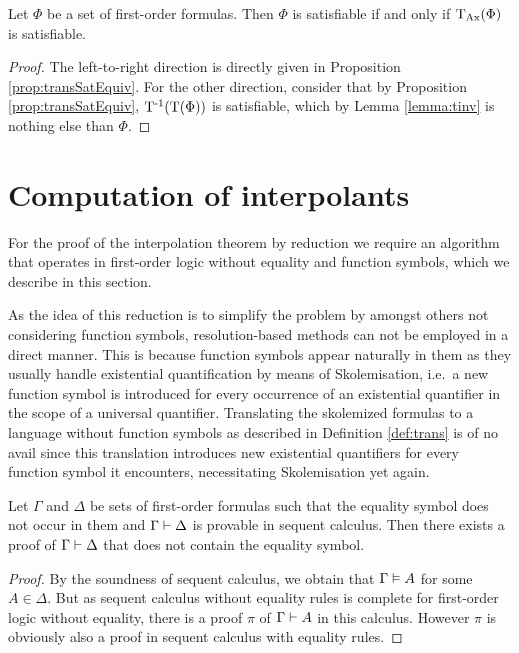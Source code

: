 \begin{corr}
	Let $\Phi$ be a set of first-order formulas.
	Then $\Phi$ is satisfiable if and only if $\operatorname{\operatorname{T}_{Ax}}(\Phi)$ is satisfiable.
\end{corr}
\begin{proof}
	The left-to-right direction is directly given in Proposition \ref{prop:transSatEquiv}.
	For the other direction, consider that by Proposition \ref{prop:transSatEquiv}, $\operatorname{T^{-1}}(\operatorname{T}(\Phi))$ is satisfiable, which by Lemma \ref{lemma:tinv} is nothing else than $\Phi$.
\end{proof}



\section{Computation of interpolants}

For the proof of the interpolation theorem by reduction we require an algorithm that operates in first-order logic without equality and function symbols, which we describe in this section.

\begin{remark}
	As the idea of this reduction is to simplify the problem by amongst others not considering function symbols,
	resolution-based methods can not be employed in a direct manner.
	This is because function symbols appear naturally in them as they usually handle existential quantification by means of Skolemisation, i.e.~a new function symbol is introduced for every occurrence of an existential quantifier in the scope of a universal quantifier.
	Translating the skolemized formulas to a language without function symbols as described in Definition \ref{def:trans} is of no avail since this translation introduces new existential quantifiers for every function symbol it encounters, necessitating Skolemisation yet again.
\end{remark}


\begin{lemma}
	\label{lemma:no_equality_in_proof}
	 Let $\Gamma$ and $\Delta$ be sets of first-order formulas such that the equality symbol does not occur in them and $\Gamma \vdash \Delta$ is provable in sequent calculus. 
	 Then there exists a proof of $\Gamma \vdash \Delta$ that does not contain the equality symbol.
\end{lemma}
\begin{proof}
	By the soundness of sequent calculus, we obtain that $\Gamma \vDash A$ for some $A \in \Delta$.
	But as sequent calculus without equality rules is complete for first-order logic without equality, there is a proof $\pi$ of $\Gamma \vdash A$ in this calculus.
	However $\pi$ is obviously also a proof in sequent calculus with equality rules.
\end{proof}

